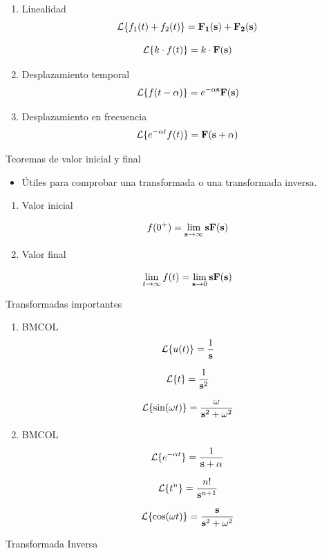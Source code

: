 \begin{enumerate}
\item Linealidad
\label{sec:org3745242}
\[
\mathcal{L}\{f_1(t) + f_2(t)\} = \mathbf{F_1}(\mathbf{s}) + \mathbf{F_2}(\mathbf{s})
\]

\[
\mathcal{L}\{k \cdot f(t)\} = k \cdot \mathbf{F}(\mathbf{s})
\]

\item Desplazamiento temporal
\label{sec:org8ed665b}
\[
\mathcal{L}\{f(t - \alpha)\} = e^{-\alpha \mathbf{s}} \mathbf{F}(\mathbf{s})
\]

\item Desplazamiento en frecuencia
\label{sec:orgebdc881}
\[
\mathcal{L}\{e^{-\alpha t}f(t)\} = \mathbf{F}(\mathbf{s} + \alpha)
\]
\end{enumerate}

{Teoremas de valor inicial y final}

\begin{itemize}
\item Útiles para comprobar una transformada o una transformada inversa.
\end{itemize}
\begin{enumerate}
\item Valor inicial
\label{sec:org897aa87}

\[
f(0^+) = \lim_{\mathbf{s} \to \infty} \mathbf{s} \mathbf{F}(\mathbf{s}) 
\]
\item Valor final
\label{sec:orgf54fe27}

\[
\lim_{t \to \infty} f(t) = \lim_{\mathbf{s} \to 0} \mathbf{s} \mathbf{F}(\mathbf{s}) 
\]
\end{enumerate}

{Transformadas importantes}


\begin{enumerate}
\item \hfill{}\textsc{BMCOL}
\label{sec:org2b07697}
\[
\mathcal{L}\{u(t)\} = \frac{1}{\mathbf{s}}
\]

\[
\mathcal{L}\{t\} = \frac{1}{\mathbf{s}^2}
\]

\[
  \mathcal{L}\{\sin(\omega t)\} = \frac{\omega}{\mathbf{s}^2 + \omega^2}
\]

\item \hfill{}\textsc{BMCOL}
\label{sec:org859a8c7}
\[
\mathcal{L}\{e^{-\alpha t}\} = \frac{1}{\mathbf{s} + \alpha}
\]


\[
\mathcal{L}\{t^n\} = \frac{n!}{\mathbf{s}^{ n+1}}
\]

\[
  \mathcal{L}\{\cos(\omega t)\} = \frac{\mathbf{s}}{\mathbf{s}^2 + \omega^2}
\]
\end{enumerate}

{Transformada Inversa}


